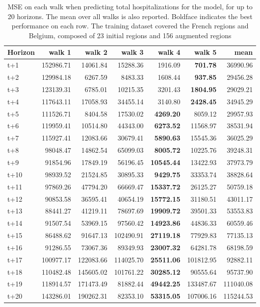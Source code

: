 \begin{table}[H]
\centering
\caption{MSE on each walk when predicting total hospitalizations for the model, for up to 20 horizons. The mean over all walks is also reported. Boldface indicates the best performance on each row. The training dataset covered the French regions and Belgium, composed of 23 initial regions and 156 augmented regions }
\label{tab:MSE_walk_dense_model}
\begin{tabular}{lrrrrrr}
\toprule
Horizon &    walk 1 &    walk 2 &    walk 3 &   walk 4 &    walk 5 &      mean \\
\midrule
t+1  & 152986.71  & 14061.84  & 15288.36  & 1916.09  & \textbf{701.78}  & 36990.96  \\
t+2  & 129984.18  & 6267.59  & 8483.33  & 1608.44  & \textbf{937.85}  & 29456.28  \\
t+3  & 123139.31  & 6785.01  & 10215.35  & 3201.43  & \textbf{1804.95}  & 29029.21  \\
t+4  & 117643.11  & 17058.93  & 34455.14  & 3140.80  & \textbf{2428.45}  & 34945.29  \\
t+5  & 111526.71  & 8404.58  & 17530.02  & \textbf{4269.20}  & 8059.12  & 29957.93  \\
t+6  & 119959.41  & 10514.80  & 44343.00  & \textbf{6273.52}  & 11568.97  & 38531.94  \\
t+7  & 115927.41  & 12083.66  & 30679.41  & \textbf{5890.63}  & 15545.36  & 36025.29  \\
t+8  & 98048.47  & 14862.54  & 65099.03  & \textbf{8005.72}  & 10225.76  & 39248.31  \\
t+9  & 91854.96  & 17849.19  & 56196.45  & \textbf{10545.44}  & 13422.93  & 37973.79  \\
t+10  & 98939.52  & 21524.85  & 30895.33  & \textbf{9429.75}  & 33353.74  & 38828.64  \\
t+11  & 97869.26  & 47794.20  & 66669.47  & \textbf{15337.72}  & 26125.27  & 50759.18  \\
t+12  & 90853.58  & 36595.41  & 40654.19  & \textbf{15772.15}  & 31180.51  & 43011.17  \\
t+13  & 88441.27  & 41219.11  & 78697.69  & \textbf{19909.72}  & 39501.33  & 53553.83  \\
t+14  & 91507.54  & 53969.15  & 97560.42  & \textbf{14923.86}  & 44836.33  & 60559.46  \\
t+15  & 86488.62  & 91647.13  & 102490.91  & \textbf{27119.18}  & 77929.83  & 77135.13  \\
t+16  & 91286.55  & 73067.36  & 89349.93  & \textbf{23007.32}  & 64281.78  & 68198.59  \\
t+17  & 100977.17  & 122083.66  & 114025.70  & \textbf{25511.06}  & 101812.95  & 92882.11  \\
t+18  & 110482.48  & 145605.02  & 101761.22  & \textbf{30285.12}  & 90555.64  & 95737.90  \\
t+19  & 118914.57  & 171473.49  & 81882.44  & \textbf{49442.25}  & 133487.67  & 111040.08  \\
t+20  & 143286.01  & 190262.31  & 82353.10  & \textbf{53315.05}  & 107006.16  & 115244.53  \\

\bottomrule
\end{tabular}
\end{table}

